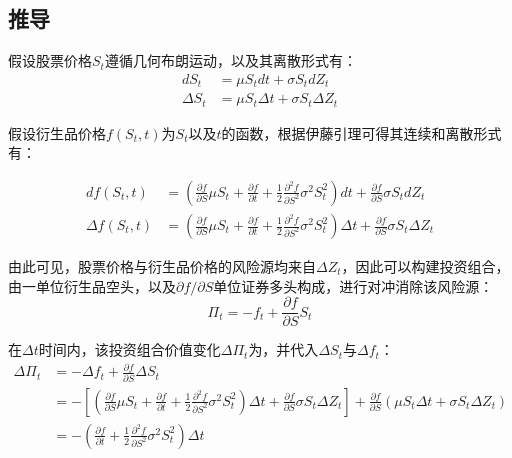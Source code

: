 \documentclass[11pt]{article}
\begin{document}
\subsection{推导}

假设股票价格$S_t$遵循几何布朗运动，以及其离散形式有：
\begin{align*}
    d S_t & = \mu S_t dt + \sigma S_t d Z_t \\
    \Delta S_t & = \mu S_t \Delta t + \sigma S_t \Delta Z_t
\end{align*}

假设衍生品价格$f(S_t, t)$为$S_t$以及$t$的函数，根据伊藤引理可得其连续和离散形式有：

\begin{align*}
    df(S_t,t) & = \left(\frac{\partial f}{\partial S} \mu S_t  + \frac{\partial f}{\partial t} + \frac{1}{2}\frac{\partial^2 f}{\partial S^2} \sigma^2 S_t^2 \right)dt + \frac{\partial f}{\partial S} \sigma S_t dZ_t \\
    \Delta f(S_t,t) & = \left(\frac{\partial f}{\partial S} \mu S_t  + \frac{\partial f}{\partial t} + \frac{1}{2}\frac{\partial^2 f}{\partial S^2} \sigma^2 S_t^2 \right) \Delta t + \frac{\partial f}{\partial S} \sigma S_t \Delta Z_t
\end{align*}

由此可见，股票价格与衍生品价格的风险源均来自$\Delta Z_t$，因此可以构建投资组合，由一单位衍生品空头，以及$\partial f/\partial S$单位证券多头构成，进行对冲消除该风险源：
\begin{equation*}
    \Pi_t = -f_t + \frac{\partial f}{\partial S} S_t
\end{equation*}

在$\Delta t$时间内，该投资组合价值变化$\Delta \Pi_t$为，并代入$\Delta S_t$与$\Delta f_t$：
\begin{align*}
    \Delta \Pi_t & = -\Delta f_t + \frac{\partial f}{\partial S} \Delta S_t \\
    & = -\left[ \left(\frac{\partial f}{\partial S} \mu S_t  + \frac{\partial f}{\partial t} + \frac{1}{2}\frac{\partial^2 f}{\partial S^2} \sigma^2 S_t^2 \right) \Delta t + \frac{\partial f}{\partial S} \sigma S_t \Delta Z_t \right] + \frac{\partial f}{\partial S} \left( \mu S_t \Delta t + \sigma S_t \Delta Z_t \right) \\
    & = -\left( \frac{\partial f}{\partial t} + \frac{1}{2}\frac{\partial^2 f}{\partial S^2} \sigma^2 S_t^2 \right) \Delta t \\
\end{align*}
\end{document}
